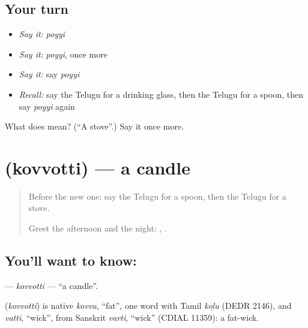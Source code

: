 \subsection*{Your turn}
\begin{itemize}
\raggedright
  \item \emph{Say it:} \emph{poyyi}
  \item \emph{Say it:} \emph{poyyi}, once more
  \item \emph{Say it:} say \emph{poyyi}
  \item \emph{Recall:} say the Telugu for a drinking glass, then the Telugu for a spoon, then say \emph{poyyi} again
\end{itemize}

\begin{tcolorbox}[breakable,colback=teal!4,colframe=teal!35!black,title={Before you move on}]
What does  mean? (\textquotedblleft{}A stove\textquotedblright{}.) Say it once more.
\end{tcolorbox}
\section[\texorpdfstring{\te{కొవ్వొత్తి} (kovvotti)}{కొవ్వొత్తి (kovvotti)}]{ (kovvotti) — a candle}

\label{lesson:TE-C113-kovvotti}



\begin{quote}
Before the new one: say the Telugu for a spoon, then the Telugu for a stove.

Greet the afternoon and the night: \textbf{ }, \textbf{ }.
\end{quote}

\subsection*{You'll want to know: }
\textbf{} — \emph{kovvotti} — \textquotedblleft{}a candle\textquotedblright{}.

\begin{cousinweb}
\textbf{} (\emph{kovvotti}) is native \emph{kovvu}, \textquotedblleft{}fat\textquotedblright{}, one word with Tamil \emph{koḻu} (DEDR 2146), and \emph{vatti}, \textquotedblleft{}wick\textquotedblright{}, from Sanskrit \emph{varti}, \textquotedblleft{}wick\textquotedblright{} (CDIAL 11359): a fat-wick.
\end{cousinweb}

